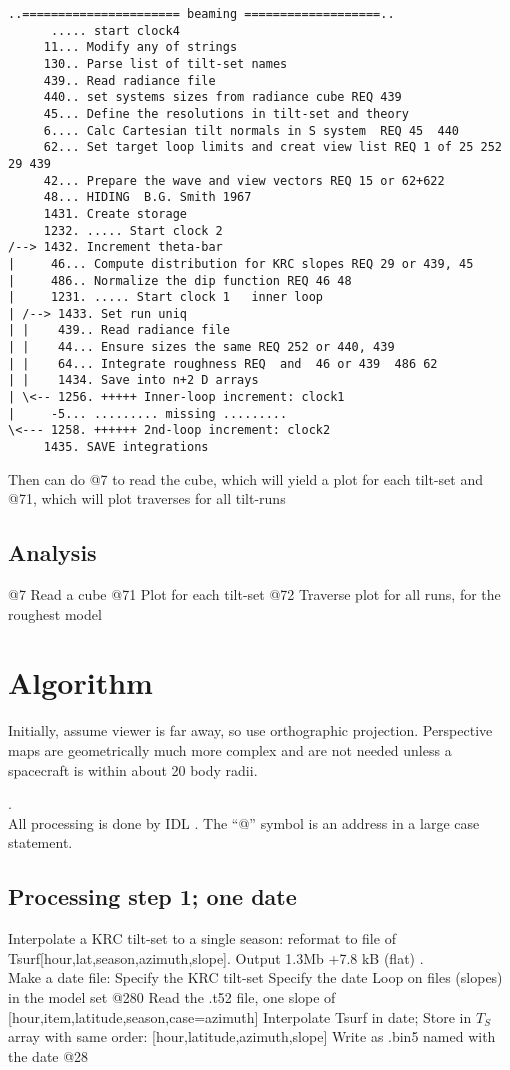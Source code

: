 \documentclass{article}
\begin{document}
\vspace{-3.mm} 
\begin{verbatim}
..====================== beaming ===================..
      ..... start clock4
     11... Modify any of strings
     130.. Parse list of tilt-set names
     439.. Read radiance file
     440.. set systems sizes from radiance cube REQ 439
     45... Define the resolutions in tilt-set and theory 
     6.... Calc Cartesian tilt normals in S system  REQ 45  440
     62... Set target loop limits and creat view list REQ 1 of 25 252 29 439
     42... Prepare the wave and view vectors REQ 15 or 62+622
     48... HIDING  B.G. Smith 1967
     1431. Create storage
     1232. ..... Start clock 2
/--> 1432. Increment theta-bar
|     46... Compute distribution for KRC slopes REQ 29 or 439, 45
|     486.. Normalize the dip function REQ 46 48
|     1231. ..... Start clock 1   inner loop
| /--> 1433. Set run uniq
| |    439.. Read radiance file
| |    44... Ensure sizes the same REQ 252 or 440, 439
| |    64... Integrate roughness REQ  and  46 or 439  486 62
| |    1434. Save into n+2 D arrays
| \<-- 1256. +++++ Inner-loop increment: clock1
|     -5... ......... missing .........
\<--- 1258. ++++++ 2nd-loop increment: clock2
     1435. SAVE integrations

\end{verbatim}

 Then can do @7 to read the cube, which will yield a plot for each tilt-set
\qi and @71, which will plot traverses for all tilt-runs
\subsection{Analysis}
@7 Read a cube
\qi @71  Plot for each tilt-set
\qi @72 Traverse plot for all runs, for the roughest model

\section{Algorithm} 

Initially, assume viewer is far away, so use orthographic
projection. Perspective maps are geometrically much more complex and are not
needed unless a spacecraft is within about 20 body radii.

.
\\ All processing is done by IDL . The ``@'' symbol is an address in a large case statement.

\subsection{Processing step 1; one date \label{s1}} 
Interpolate a KRC tilt-set to a single season: reformat to file of
Tsurf[hour,lat,season,azimuth,slope].  Output 1.3Mb +7.8 kB (flat)
.
\\ Make a date file:
\qi Specify the KRC tilt-set
\qi Specify the date
\qii Loop on files (slopes) in the model set  @280
\qii Read the .t52 file, one slope of [hour,item,latitude,season,case=azimuth]
\qiii Interpolate Tsurf in date;
\qiii Store in $T_S$ array with same order: [hour,latitude,azimuth,slope] 
\qii Write as .bin5 named with the date  @28
\end{document}
